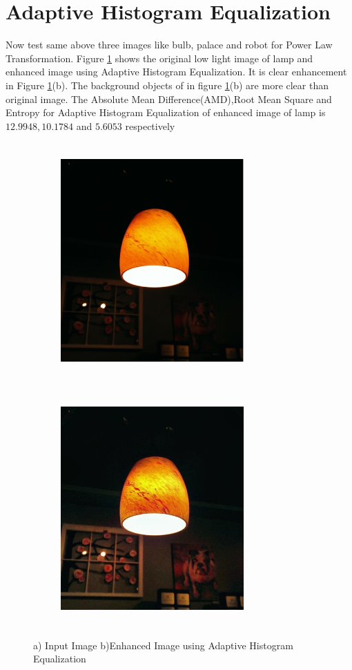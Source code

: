 \section{Adaptive Histogram Equalization}
Now test same above three images like bulb, palace and robot for Power Law Transformation. Figure \ref{fig:AHE} shows the original low light image of lamp and enhanced image using Adaptive Histogram Equalization. It is clear enhancement in Figure \ref{fig:AHE}(b). The background objects of in figure \ref{fig:AHE}(b) are more clear than original image. The Absolute Mean Difference(AMD),Root Mean Square and Entropy for Adaptive Histogram Equalization of enhanced image of lamp is $12.9948,10.1784$ and $5.6053$ respectively      


\begin{figure}
	\begin{subfigure}{8cm}
		\centering    
    	\includegraphics[width=7cm,height=9cm,keepaspectratio]{images/ch5/bulb_input.jpg}
    	\caption{} 
    \end{subfigure}
  	\begin{subfigure}{6cm}
  		\centering
  		\includegraphics[width=7cm,height=9cm,keepaspectratio]{images/ch5/bulb_adapt_hist.jpg}
   		\caption{}
  	\end{subfigure}
  	\caption{a) Input Image b)Enhanced Image using Adaptive Histogram Equalization}
  	\label{fig:AHE}
\end{figure}


